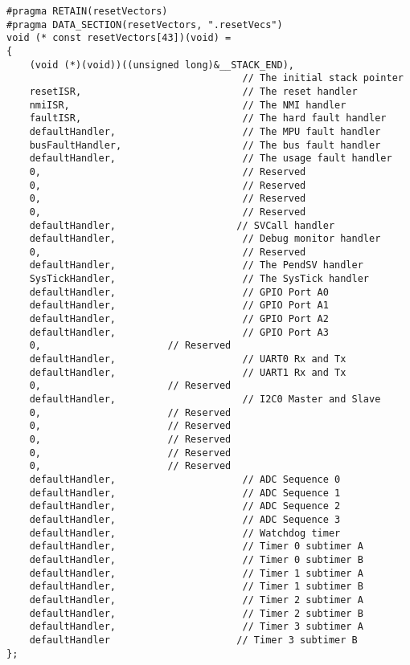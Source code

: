 \begin{lstlisting}[style=CStyle, caption={Vector table used in assignment two and three}, captionpos=b, label={lst:vector_table_complete}, escapechar=|]
#pragma RETAIN(resetVectors)
#pragma DATA_SECTION(resetVectors, ".resetVecs")
void (* const resetVectors[43])(void) =
{
    (void (*)(void))((unsigned long)&__STACK_END),
                                         // The initial stack pointer
    resetISR,                            // The reset handler
    nmiISR,                              // The NMI handler
    faultISR,                            // The hard fault handler
    defaultHandler,                      // The MPU fault handler
    busFaultHandler,                     // The bus fault handler
    defaultHandler,                      // The usage fault handler
    0,                                   // Reserved
    0,                                   // Reserved
    0,                                   // Reserved
    0,                                   // Reserved
    defaultHandler,                     // SVCall handler
    defaultHandler,                      // Debug monitor handler
    0,                                   // Reserved
    defaultHandler,                      // The PendSV handler
    SysTickHandler,                      // The SysTick handler
    defaultHandler,                      // GPIO Port A0
    defaultHandler,                      // GPIO Port A1
    defaultHandler,                      // GPIO Port A2
    defaultHandler,                      // GPIO Port A3
    0,                      // Reserved
    defaultHandler,                      // UART0 Rx and Tx
    defaultHandler,                      // UART1 Rx and Tx
    0,                      // Reserved
    defaultHandler,                      // I2C0 Master and Slave
    0,                      // Reserved
    0,                      // Reserved
    0,                      // Reserved
    0,                      // Reserved
    0,                      // Reserved
    defaultHandler,                      // ADC Sequence 0
    defaultHandler,                      // ADC Sequence 1
    defaultHandler,                      // ADC Sequence 2
    defaultHandler,                      // ADC Sequence 3
    defaultHandler,                      // Watchdog timer
    defaultHandler,                      // Timer 0 subtimer A
    defaultHandler,                      // Timer 0 subtimer B
    defaultHandler,                      // Timer 1 subtimer A
    defaultHandler,                      // Timer 1 subtimer B
    defaultHandler,                      // Timer 2 subtimer A
    defaultHandler,                      // Timer 2 subtimer B
    defaultHandler,                      // Timer 3 subtimer A
    defaultHandler                      // Timer 3 subtimer B
};

\end{lstlisting}

